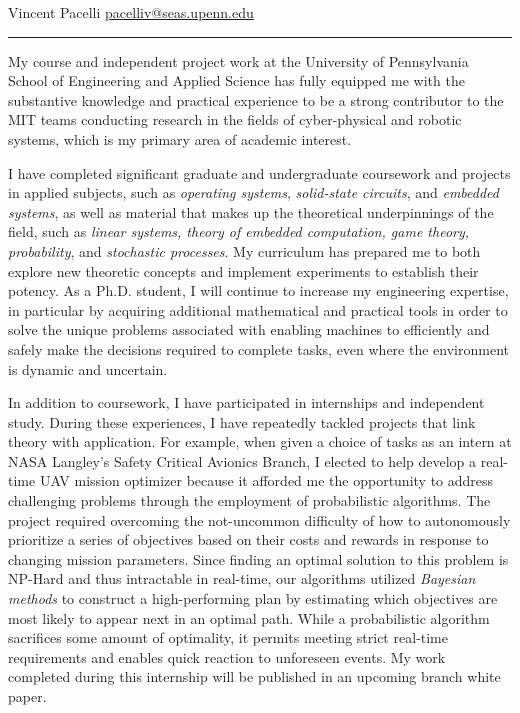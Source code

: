 \documentclass[11pt]{letter}
\title{}
\author{}
\begin{document}
\newcommand{\comm}[1]{}

Vincent Pacelli \hfill \hfill \href{mailto:pacelliv@seas.upenn.edu}{pacelliv@seas.upenn.edu}\\
\rule{\textwidth}{0.1pt}

My course and independent project work at the University of Pennsylvania School of Engineering and Applied Science has fully equipped me with the substantive knowledge and practical experience to be a strong contributor to the MIT teams conducting research in the fields of cyber-physical and robotic systems, which is my primary area of academic interest.

I have completed significant graduate and undergraduate coursework and projects in applied subjects, such as \emph{operating systems}, \emph{solid-state circuits}, and \emph{embedded systems}, as well as material that makes up the theoretical underpinnings of the field, such as \emph{linear systems, theory of embedded computation, game theory, probability}, and \emph{stochastic processes}.  My curriculum has prepared me to both explore new theoretic concepts and implement experiments to establish their potency.  As a Ph.D. student, I will continue to increase my engineering expertise, in particular by acquiring additional mathematical and practical tools in order to solve the unique problems associated with enabling machines to efficiently and safely make the decisions required to complete tasks, even where the environment is dynamic and uncertain.

In addition to coursework, I have participated in internships and independent study. During these experiences, I have repeatedly tackled projects that link theory with application. For example, when given a choice of tasks as an intern at NASA Langley’s Safety Critical Avionics Branch, I elected to help develop a real-time UAV mission optimizer because it afforded me the opportunity to address challenging problems through the employment of probabilistic algorithms. The project required overcoming the not-uncommon difficulty of how to autonomously prioritize a series of objectives based on their costs and rewards in response to changing mission parameters. Since finding an optimal solution to this problem is NP-Hard and thus intractable in real-time, our algorithms utilized \emph{Bayesian methods} to construct a high-performing plan by estimating which objectives are most likely to appear next in an optimal path.  While a probabilistic algorithm sacrifices some amount of optimality, it permits meeting strict real‑time requirements and enables quick reaction to unforeseen events.  My work completed during this internship will be published in an upcoming branch white paper.
\end{document}
